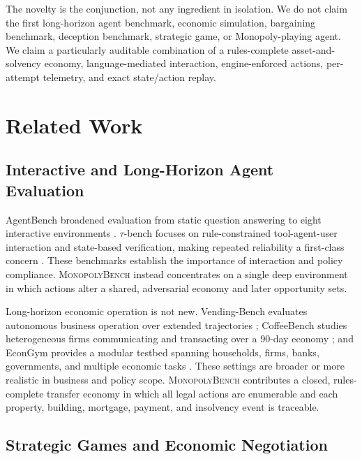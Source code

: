 \documentclass[conference]{IEEEtran}
\newcommand{\Bench}{\textsc{MonopolyBench}\xspace}
\begin{document}
The novelty is the conjunction, not any ingredient in isolation. We do not claim the first long-horizon agent benchmark, economic simulation, bargaining benchmark, deception benchmark, strategic game, or Monopoly-playing agent. We claim a particularly auditable combination of a rules-complete asset-and-solvency economy, language-mediated interaction, engine-enforced actions, per-attempt telemetry, and exact state/action replay.

\section{Related Work}
\label{sec:related}

\subsection{Interactive and Long-Horizon Agent Evaluation}

AgentBench broadened evaluation from static question answering to eight interactive environments \cite{agentbench}. $\tau$-bench focuses on rule-constrained tool-agent-user interaction and state-based verification, making repeated reliability a first-class concern \cite{taubench}. These benchmarks establish the importance of interaction and policy compliance. \Bench instead concentrates on a single deep environment in which actions alter a shared, adversarial economy and later opportunity sets.

Long-horizon economic operation is not new. Vending-Bench evaluates autonomous business operation over extended trajectories \cite{vendingbench}; CoffeeBench studies heterogeneous firms communicating and transacting over a 90-day economy \cite{coffeebench}; and EconGym provides a modular testbed spanning households, firms, banks, governments, and multiple economic tasks \cite{econgym}. These settings are broader or more realistic in business and policy scope. \Bench contributes a closed, rules-complete transfer economy in which all legal actions are enumerable and each property, building, mortgage, payment, and insolvency event is traceable.

\subsection{Strategic Games and Economic Negotiation}
\end{document}
